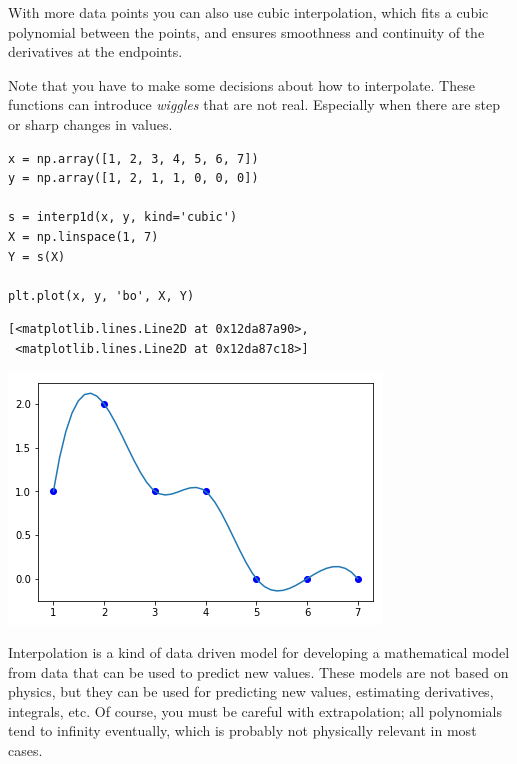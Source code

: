 \documentclass[11pt]{article}
\begin{document}
With more data points you can also use cubic interpolation, which fits a cubic polynomial between the points, and ensures smoothness and continuity of the derivatives at the endpoints.

Note that you have to make some decisions about how to interpolate. These functions can introduce \emph{wiggles} that are not real. Especially when there are step or sharp changes  in values.

\begin{verbatim}
x = np.array([1, 2, 3, 4, 5, 6, 7])
y = np.array([1, 2, 1, 1, 0, 0, 0])

s = interp1d(x, y, kind='cubic')
X = np.linspace(1, 7)
Y = s(X)

plt.plot(x, y, 'bo', X, Y)
\end{verbatim}

\begin{verbatim}
[<matplotlib.lines.Line2D at 0x12da87a90>,
 <matplotlib.lines.Line2D at 0x12da87c18>]
\end{verbatim}



\begin{center}
\includegraphics[width=.9\linewidth]{obipy-resources/e021eb5cde8c0f560ad245cab4a1f678-55929XUp.png}
\end{center}

Interpolation is a kind of data driven model for developing a mathematical model from data that can be used to predict new values. These models are not based on physics, but they can be used for predicting new values, estimating derivatives, integrals, etc. Of course, you must be careful with extrapolation; all polynomials tend to \textpm{} infinity eventually, which is probably not physically relevant in most cases.
\end{document}
